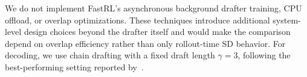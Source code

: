 We do not implement FastRL's asynchronous background drafter training, CPU offload, or overlap optimizations.
These techniques introduce additional system-level design choices beyond the drafter itself and would make the comparison depend on overlap efficiency rather than only rollout-time SD behavior.
For decoding, we use chain drafting with a fixed draft length $\gamma=3$, following the best-performing setting reported by~\citet{iso2026accelerating}.
